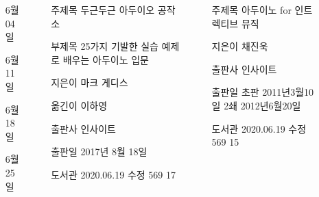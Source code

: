 \documentclass[20pt, a1paper ]{tikzposter}
\begin{document}
\begin{columns}
{		}		




			{				
			\setlength{\leftmargini}{9em}			
			\setlength{\labelsep}{1em} %

			\begin{LARGE}
			\begin{itemize}
			\item [6월 04일]
			\item [6월 11일]
			\item [6월 18일]
			\item [6월 25일]
			\end{itemize}
			\end{LARGE}
		}


			{				
			\setlength{\leftmargini}{9em}			
			\setlength{\labelsep}{1em} %

			\begin{LARGE}
			\begin{itemize}
			\item [주제목] 두근두근 아두이오 공작소 
			\item [부제목] 25가지 기발한 실습 예제로 배우는 아두이노 입문
			\item [지은이] 마크 게디스
			\item [옮긴이] 이하영
			\item [출판사] 인사이트
			\item [출판일] 2017년 8월 18일
			\item [도서관] 2020.06.19 수정 569 17

			\end{itemize}
			\end{LARGE}
		}


			{				
			\setlength{\leftmargini}{9em}			
			\setlength{\labelsep}{1em} %

			\begin{LARGE}
			\begin{itemize}
			\item [주제목] 아두이노 for 인트렉티브 뮤직 
			\item [지은이] 채진욱
			\item [출판사] 인사이트
			\item [출판일] 초판 2011년3월10일 2쇄 2012년6월20일
			\item [도서관] 2020.06.19 수정 569 15

			\end{itemize}
			\end{LARGE}
		}


	\end{columns}
\end{document}
